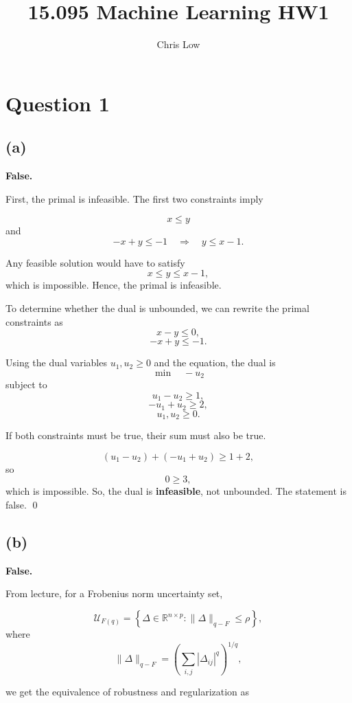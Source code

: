 \documentclass{article}
\title{15.095 Machine Learning HW1}
\author{Chris Low}
\date{} %
\begin{document}
\maketitle

\section*{Question 1}

\subsection*{(a)}

\textbf{False.}

\noindent First, the primal is infeasible. The first two constraints imply


\[
x \leq y
\]
and
\[
-x+y\leq -1
\quad\Longrightarrow\quad
y\leq x-1.
\]

\noindent Any feasible solution would have to satisfy
\[
x\leq y\leq x-1,
\]
which is impossible. Hence, the primal is infeasible.

\vspace{3mm}

\noindent To determine whether the dual is unbounded, we can rewrite the primal constraints as
\[
x-y\leq 0,
\]
\[
-x+y\leq -1.
\]

\noindent Using the dual variables $u_1,u_2\geq 0$ and the equation, the dual is
\[
\min \quad -u_2
\]
subject to
\[
u_1-u_2\geq 1,
\]
\[
-u_1+u_2\geq 2,
\]
\[
u_1,u_2\geq 0.
\]

\noindent If both constraints must be true, their sum must also be true.

\[
(u_1-u_2)+(-u_1+u_2)\geq 1+2,
\]
so
\[
0\geq 3,
\]
which is impossible. So, the dual is \textbf{infeasible}, not unbounded. The statement is false. \qed

\newpage

\subsection*{(b)}
\textbf{False.}

\noindent From lecture, for a Frobenius norm uncertainty set,

\[
\mathcal{U}_{F(q)}
=
\left\{
\Delta \in \mathbb{R}^{n \times p}
:
\|\Delta\|_{q-F} \leq \rho
\right\},
\]
where
\[
\|\Delta\|_{q-F}
=
\left(
\sum_{i,j} |\Delta_{ij}|^q
\right)^{1/q},
\]

\noindent we get the equivalence of robustness and regularization as
\end{document}
